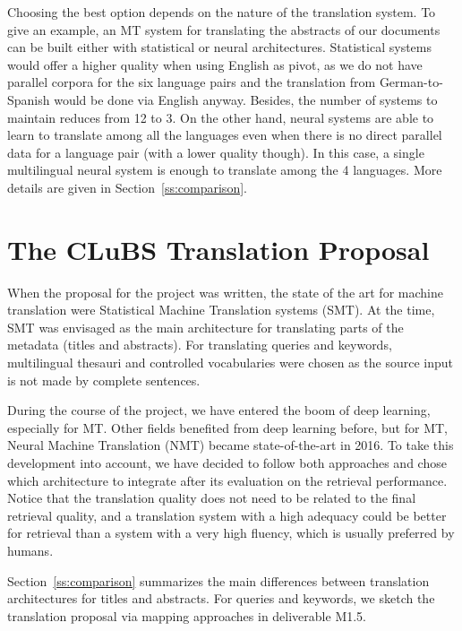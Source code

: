 \documentclass[a4paper,11pt]{article}
\begin{document}
Choosing the best option depends on the nature of the translation system. To give an example, an MT system for translating the abstracts of our documents can be built either with statistical or neural architectures. Statistical systems would offer a higher quality when using English as pivot, as we do not have parallel corpora for the six language pairs and the translation from German-to-Spanish would be done via English anyway. Besides, the number of systems to maintain reduces from 12 to 3.
On the other hand, neural systems are able to learn to translate among all the languages even when there is no direct parallel data for a language pair (with a lower quality though). In this case, a single multilingual neural system is enough to translate among the 4 languages. More details are given in Section~\ref{ss:comparison}.



\section{The CLuBS Translation Proposal}
\label{s:proposal}

When the proposal for the project was written, the state of the art for machine translation were Statistical Machine Translation systems (SMT). At the time, SMT was envisaged as the main architecture for translating parts of the metadata (titles and abstracts). For translating queries and keywords, multilingual thesauri and controlled vocabularies were chosen as the source input is not made by complete sentences.

During the course of the project, we have entered the boom of deep learning, especially for MT. Other fields benefited from deep learning before, but for MT, Neural Machine Translation (NMT) became state-of-the-art in 2016. To take this development into account, we have decided to follow both approaches and chose which architecture to integrate after its evaluation on the retrieval performance. Notice that the translation quality does not need to be related to the final retrieval quality, and a translation system with a high adequacy could be better for retrieval than a system with a very high fluency, which is usually preferred by humans.

Section~\ref{ss:comparison} summarizes the main differences between translation architectures for titles and abstracts. For queries and keywords, we sketch the translation proposal via mapping approaches in deliverable M1.5.
\end{document}
